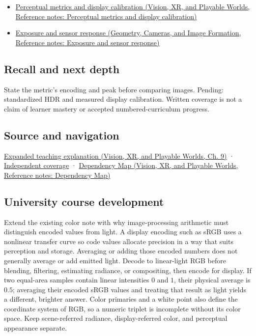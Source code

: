 \begin{itemize}
\tightlist
\item
  \href{../07-Vision-XR-and-Playable-Worlds/main.pdf\#nameddest=appendix-b2c1846508bf}{Perceptual metrics and display calibration (Vision, XR, and Playable Worlds, Reference notes: Perceptual metrics and display calibration)}
\item
  \href{../03-Geometry-Cameras-and-Image-Formation/main.pdf\#nameddest=appendix-92d45cdf2afc}{Exposure and sensor response (Geometry, Cameras, and Image Formation, Reference notes: Exposure and sensor response)}
\end{itemize}

\subsection{Recall and next depth}\label{appendix-a9f83ad40792-recall-and-next-depth}

State the metric's encoding and peak before comparing images. Pending: standardized HDR and measured display calibration. Written coverage is not a claim of learner mastery or accepted numbered-curriculum progress.

\subsection{Source and navigation}\label{appendix-a9f83ad40792-source-and-navigation}

\href{../07-Vision-XR-and-Playable-Worlds/main.pdf\#nameddest=04-visual-computing-ii-ch042-encoded-rgb-must-not-masquerade-as-linear-light}{Expanded teaching explanation (Vision, XR, and Playable Worlds, Ch. 9)} · \hyperref[appendix-fd090d982a15-xr01---independent-seeing-and-representation-source]{Independent coverage} · \href{../07-Vision-XR-and-Playable-Worlds/main.pdf\#nameddest=appendix-4ad47bdd269a}{Dependency Map (Vision, XR, and Playable Worlds, Reference notes: Dependency Map)}

\subsection{University course development}\label{appendix-a9f83ad40792-university-course-development}

Extend the existing color note with why image-processing arithmetic must distinguish encoded values from light. A display encoding such as sRGB uses a nonlinear transfer curve so code values allocate precision in a way that suits perception and storage. Averaging or adding those encoded numbers does not generally average or add emitted light. Decode to linear-light RGB before blending, filtering, estimating radiance, or compositing, then encode for display. If two equal-area samples contain linear intensities \(0\) and \(1\), their physical average is \(0.5\); averaging their encoded sRGB values and treating that result as light yields a different, brighter answer. Color primaries and a white point also define the coordinate system of RGB, so a numeric triplet is incomplete without its color space. Keep scene-referred radiance, display-referred color, and perceptual appearance separate.

